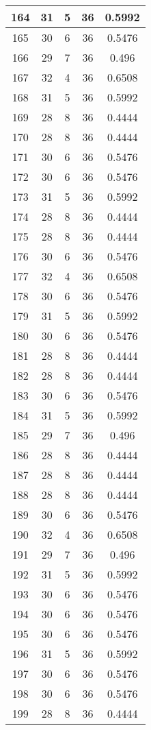 \documentclass[letterpaper, 12pt]{article}
\begin{document}
\begin{longtable}{|c|c|c|c|c|}
\hline
164 & 31 & 5 & 36 & 0.5992 \\
\hline
165 & 30 & 6 & 36 & 0.5476 \\
\hline
166 & 29 & 7 & 36 & 0.496 \\
\hline
167 & 32 & 4 & 36 & 0.6508 \\
\hline
168 & 31 & 5 & 36 & 0.5992 \\
\hline
169 & 28 & 8 & 36 & 0.4444 \\
\hline
170 & 28 & 8 & 36 & 0.4444 \\
\hline
171 & 30 & 6 & 36 & 0.5476 \\
\hline
172 & 30 & 6 & 36 & 0.5476 \\
\hline
173 & 31 & 5 & 36 & 0.5992 \\
\hline
174 & 28 & 8 & 36 & 0.4444 \\
\hline
175 & 28 & 8 & 36 & 0.4444 \\
\hline
176 & 30 & 6 & 36 & 0.5476 \\
\hline
177 & 32 & 4 & 36 & 0.6508 \\
\hline
178 & 30 & 6 & 36 & 0.5476 \\
\hline
179 & 31 & 5 & 36 & 0.5992 \\
\hline
180 & 30 & 6 & 36 & 0.5476 \\
\hline
181 & 28 & 8 & 36 & 0.4444 \\
\hline
182 & 28 & 8 & 36 & 0.4444 \\
\hline
183 & 30 & 6 & 36 & 0.5476 \\
\hline
184 & 31 & 5 & 36 & 0.5992 \\
\hline
185 & 29 & 7 & 36 & 0.496 \\
\hline
186 & 28 & 8 & 36 & 0.4444 \\
\hline
187 & 28 & 8 & 36 & 0.4444 \\
\hline
188 & 28 & 8 & 36 & 0.4444 \\
\hline
189 & 30 & 6 & 36 & 0.5476 \\
\hline
190 & 32 & 4 & 36 & 0.6508 \\
\hline
191 & 29 & 7 & 36 & 0.496 \\
\hline
192 & 31 & 5 & 36 & 0.5992 \\
\hline
193 & 30 & 6 & 36 & 0.5476 \\
\hline
194 & 30 & 6 & 36 & 0.5476 \\
\hline
195 & 30 & 6 & 36 & 0.5476 \\
\hline
196 & 31 & 5 & 36 & 0.5992 \\
\hline
197 & 30 & 6 & 36 & 0.5476 \\
\hline
198 & 30 & 6 & 36 & 0.5476 \\
\hline
199 & 28 & 8 & 36 & 0.4444 \\
\hline
\end{longtable}
\end{document}
